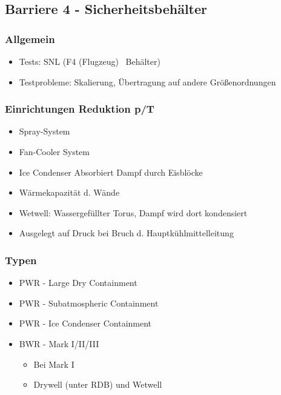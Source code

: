 \documentclass[12pt]{article}
\begin{document}
\subsection{Barriere 4 - Sicherheitsbehälter}

\subsubsection{Allgemein}
\begin{itemize}[noitemsep]
	\item Tests: SNL (F4 (Flugzeug) \textrightarrow\ Behälter)
	\item Testprobleme: Skalierung, Übertragung auf andere Größenordnungen
\end{itemize}

\subsubsection{Einrichtungen Reduktion p/T}
\begin{itemize}[noitemsep]
	\item Spray-System
	\item Fan-Cooler System
	\item Ice Condenser \textrightarrow Absorbiert Dampf durch Eisblöcke
	\item Wärmekapazität d. Wände
	\item Wetwell: Wassergefüllter Torus, Dampf wird dort kondensiert
	\item Ausgelegt auf Druck bei Bruch d. Hauptkühlmittelleitung
\end{itemize}

\subsubsection{Typen}
\begin{itemize}[noitemsep]
	\item PWR - Large Dry Containment
	\item PWR - Subatmospheric Containment
	\item PWR - Ice Condenser Containment
	\item BWR - Mark I/II/III
		\begin{itemize}[noitemsep]
			\item Bei Mark I
			\item Drywell (unter RDB) und Wetwell
		\end{itemize}
\end{itemize}
\end{document}
